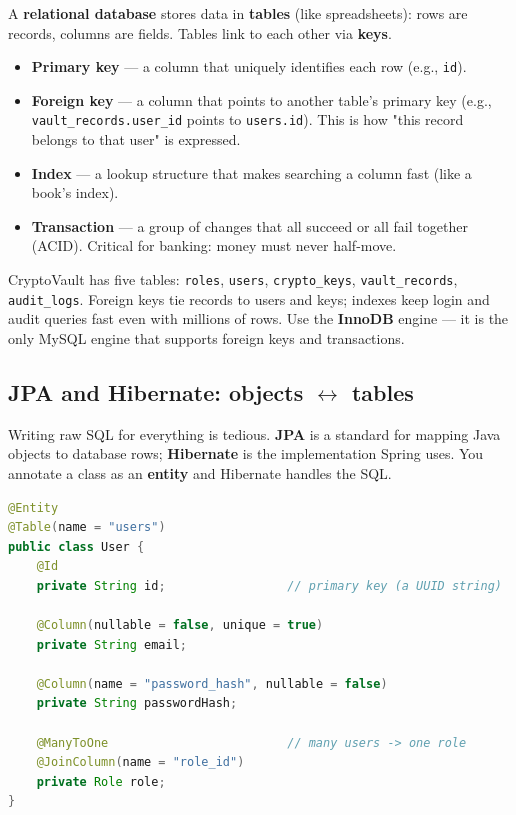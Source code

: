 \documentclass[11pt,a4paper]{article}
\begin{document}
A \textbf{relational database} stores data in \textbf{tables} (like spreadsheets): rows are
records, columns are fields. Tables link to each other via \textbf{keys}.

\begin{itemize}[leftmargin=*]
  \item \textbf{Primary key} — a column that uniquely identifies each row (e.g., \texttt{id}).
  \item \textbf{Foreign key} — a column that points to another table's primary key (e.g.,
        \texttt{vault\_records.user\_id} points to \texttt{users.id}). This is how "this record
        belongs to that user" is expressed.
  \item \textbf{Index} — a lookup structure that makes searching a column fast (like a book's index).
  \item \textbf{Transaction} — a group of changes that all succeed or all fail together (ACID).
        Critical for banking: money must never half-move.
\end{itemize}

\begin{whymatters}
CryptoVault has five tables: \texttt{roles}, \texttt{users}, \texttt{crypto\_keys},
\texttt{vault\_records}, \texttt{audit\_logs}. Foreign keys tie records to users and keys; indexes
keep login and audit queries fast even with millions of rows. Use the \textbf{InnoDB} engine —
it is the only MySQL engine that supports foreign keys and transactions.
\end{whymatters}

\subsection{JPA and Hibernate: objects $\leftrightarrow$ tables}

Writing raw SQL for everything is tedious. \textbf{JPA} is a standard for mapping Java objects to
database rows; \textbf{Hibernate} is the implementation Spring uses. You annotate a class as an
\textbf{entity} and Hibernate handles the SQL.

\begin{lstlisting}[language=Java]
@Entity
@Table(name = "users")
public class User {
    @Id
    private String id;                 // primary key (a UUID string)

    @Column(nullable = false, unique = true)
    private String email;

    @Column(name = "password_hash", nullable = false)
    private String passwordHash;

    @ManyToOne                         // many users -> one role
    @JoinColumn(name = "role_id")
    private Role role;
}
\end{lstlisting}
\end{document}
